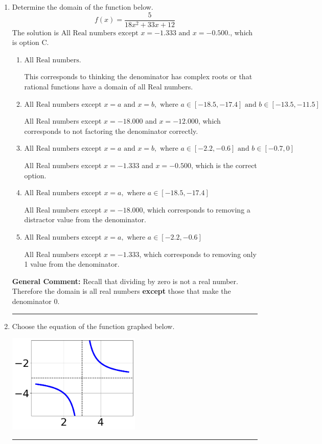 \documentclass{extbook}[14pt]
\newcommand{\litem}[1]{\item #1

\rule{\textwidth}{0.4pt}}
\begin{document}
\begin{enumerate}\litem{
Determine the domain of the function below.
\[ f(x) = \frac{5}{18x^{2} +33 x + 12} \]The solution is \( \text{All Real numbers except } x = -1.333 \text{ and } x = -0.500. \), which is option C.\begin{enumerate}[label=\Alph*.]
\item \( \text{All Real numbers.} \)

This corresponds to thinking the denominator has complex roots or that rational functions have a domain of all Real numbers.
\item \( \text{All Real numbers except } x = a \text{ and } x = b, \text{ where } a \in [-18.5, -17.4] \text{ and } b \in [-13.5, -11.5] \)

All Real numbers except $x = -18.000$ and $x = -12.000$, which corresponds to not factoring the denominator correctly.
\item \( \text{All Real numbers except } x = a \text{ and } x = b, \text{ where } a \in [-2.2, -0.6] \text{ and } b \in [-0.7, 0] \)

All Real numbers except $x = -1.333$ and $x = -0.500$, which is the correct option.
\item \( \text{All Real numbers except } x = a, \text{ where } a \in [-18.5, -17.4] \)

All Real numbers except $x = -18.000$, which corresponds to removing a distractor value from the denominator.
\item \( \text{All Real numbers except } x = a, \text{ where } a \in [-2.2, -0.6] \)

All Real numbers except $x = -1.333$, which corresponds to removing only 1 value from the denominator.
\end{enumerate}

\textbf{General Comment:} Recall that dividing by zero is not a real number. Therefore the domain is all real numbers \textbf{except} those that make the denominator 0.
}
\litem{
Choose the equation of the function graphed below.

\begin{center}
    \includegraphics[width=0.5\textwidth]{../Figures/rationalGraphToEquationCopyC.png}
\end{center}


}
\end{enumerate}
\end{document}
